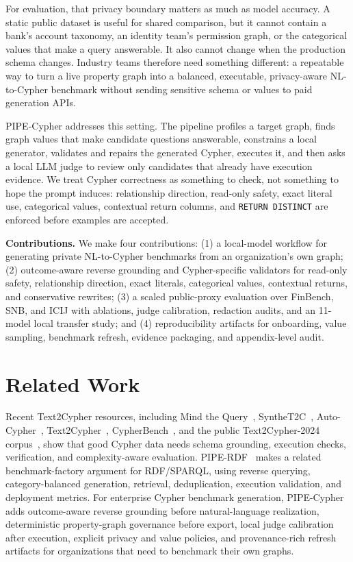 \documentclass[11pt]{article}
\begin{document}
For evaluation, that privacy boundary matters as much as model accuracy. A static public dataset is useful for shared comparison, but it cannot contain a bank's account taxonomy, an identity team's permission graph, or the categorical values that make a query answerable. It also cannot change when the production schema changes. Industry teams therefore need something different: a repeatable way to turn a live property graph into a balanced, executable, privacy-aware NL-to-Cypher benchmark without sending sensitive schema or values to paid generation APIs.

PIPE-Cypher addresses this setting. The pipeline profiles a target graph, finds graph values that make candidate questions answerable, constrains a local generator, validates and repairs the generated Cypher, executes it, and then asks a local LLM judge to review only candidates that already have execution evidence. We treat Cypher correctness as something to check, not something to hope the prompt induces: relationship direction, read-only safety, exact literal use, categorical values, contextual return columns, and \texttt{RETURN DISTINCT} are enforced before examples are accepted.

\noindent\textbf{Contributions.} We make four contributions: (1) a local-model workflow for generating private NL-to-Cypher benchmarks from an organization's own graph; (2) outcome-aware reverse grounding and Cypher-specific validators for read-only safety, relationship direction, exact literals, categorical values, contextual returns, and conservative rewrites; (3) a scaled public-proxy evaluation over FinBench, SNB, and ICIJ with ablations, judge calibration, redaction audits, and an 11-model local transfer study; and (4) reproducibility artifacts for onboarding, value sampling, benchmark refresh, evidence packaging, and appendix-level audit.

\section{Related Work}
Recent Text2Cypher resources, including Mind the Query~\citep{mindthequery2025}, SyntheT2C~\citep{synthet2c2025}, Auto-Cypher~\citep{autocypher2025}, Text2Cypher~\citep{text2cypher2025}, CypherBench~\citep{cypherbench2025}, and the public Text2Cypher-2024 corpus~\citep{text2cypher2024dataset}, show that good Cypher data needs schema grounding, execution checks, verification, and complexity-aware evaluation. PIPE-RDF~\citep{ranganath2026piperd} makes a related benchmark-factory argument for RDF/SPARQL, using reverse querying, category-balanced generation, retrieval, deduplication, execution validation, and deployment metrics. For enterprise Cypher benchmark generation, PIPE-Cypher adds outcome-aware reverse grounding before natural-language realization, deterministic property-graph governance before export, local judge calibration after execution, explicit privacy and value policies, and provenance-rich refresh artifacts for organizations that need to benchmark their own graphs.
\end{document}
